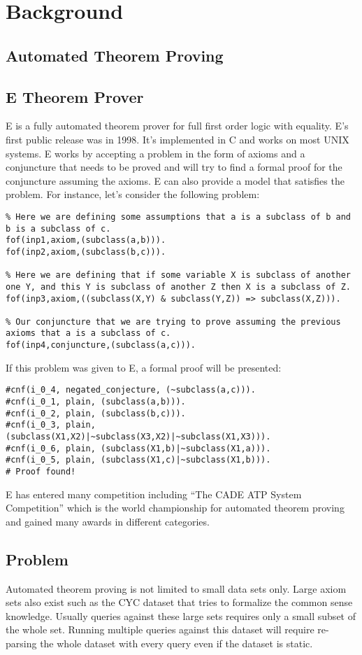 \chapter{Background}\label{chap:background}

\section{Automated Theorem Proving}
\section{E Theorem Prover}
E is a fully automated theorem prover for full first order logic with equality. E's first public release was in 1998. It's implemented in C and works on most UNIX systems. E works by accepting a problem in the form of axioms and a conjuncture that needs to be proved and will try to find a formal proof for the conjuncture assuming the axioms. E can also provide a model that satisfies the problem. For instance, let's consider the following problem:
\begin{lstlisting}
% Here we are defining some assumptions that a is a subclass of b and b is a subclass of c.
fof(inp1,axiom,(subclass(a,b))).
fof(inp2,axiom,(subclass(b,c))).

% Here we are defining that if some variable X is subclass of another one Y, and this Y is subclass of another Z then X is a subclass of Z.
fof(inp3,axiom,((subclass(X,Y) & subclass(Y,Z)) => subclass(X,Z))).

% Our conjuncture that we are trying to prove assuming the previous axioms that a is a subclass of c.
fof(inp4,conjuncture,(subclass(a,c))).
\end{lstlisting}
If this problem was given to E, a formal proof will be presented:
\begin{lstlisting}
#cnf(i_0_4, negated_conjecture, (~subclass(a,c))).
#cnf(i_0_1, plain, (subclass(a,b))).
#cnf(i_0_2, plain, (subclass(b,c))).
#cnf(i_0_3, plain, (subclass(X1,X2)|~subclass(X3,X2)|~subclass(X1,X3))).
#cnf(i_0_6, plain, (subclass(X1,b)|~subclass(X1,a))).
#cnf(i_0_5, plain, (subclass(X1,c)|~subclass(X1,b))).
# Proof found!
\end{lstlisting}
E has entered many competition including ``The CADE ATP System Competition'' which is the world championship for automated theorem proving and gained many awards in different categories.

\section{Problem}
Automated theorem proving is not limited to small data sets only. Large axiom sets also exist such as the CYC dataset that tries to formalize the common sense knowledge. Usually queries against these large sets requires only a small subset of the whole set. Running multiple queries against this dataset will require re-parsing the whole dataset with every query even if the dataset is static.
